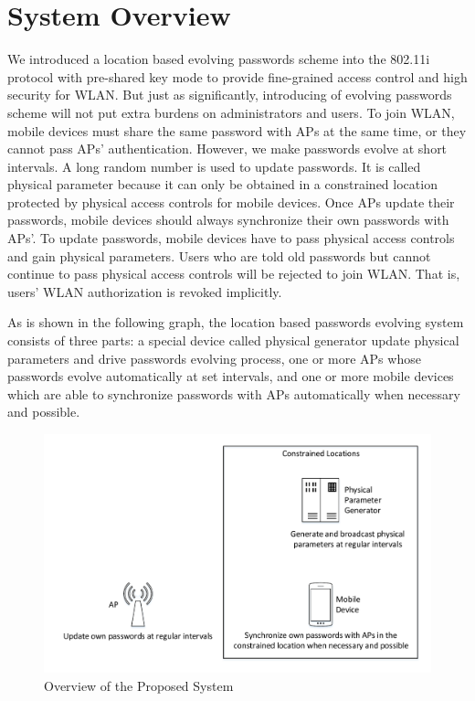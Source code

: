 \section{System Overview}
We introduced a location based evolving passwords scheme into the 802.11i protocol with pre-shared key mode to provide fine-grained access control and high security for WLAN. But just as significantly, introducing of evolving passwords scheme will not put extra burdens on administrators and users. To join WLAN, mobile devices must share the same password with APs at the same time, or they cannot pass APs’ authentication. However, we make passwords evolve at short intervals. A long random number is used to update passwords. It is called physical parameter because it can only be obtained in a constrained location protected by physical access controls for mobile devices. Once APs update their passwords, mobile devices should always synchronize their own passwords with APs’. To update passwords, mobile devices have to pass physical access controls and gain physical parameters. Users who are told old passwords but cannot continue to pass physical access controls will be rejected to join WLAN. That is, users’ WLAN authorization is revoked implicitly. 

As is shown in the following graph, the location based passwords evolving system consists of three parts: a special device called physical generator update physical parameters and drive passwords evolving process, one or more APs whose passwords evolve automatically at set intervals, and one or more mobile devices which are able to synchronize passwords with APs automatically when necessary and possible. 
\begin{figure}
	\begin{center}
		\includegraphics[width=\textwidth]{System_Overview.pdf}
		\caption{Overview of the Proposed System}
		\label{Fig:3.1}
	\end{center}
\end{figure}


